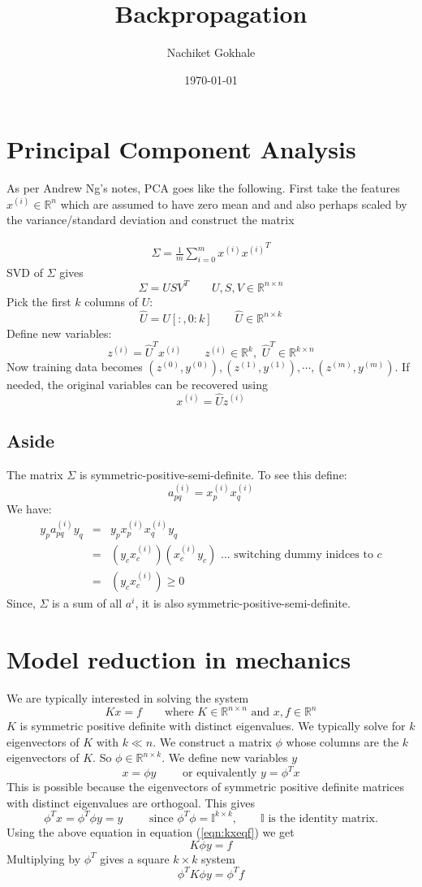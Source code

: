 \documentclass{article}
\newcommand{\beq}{\begin{equation}}
\newcommand{\eeq}{\end{equation}}
\newcommand{\ber}{\begin{eqnarray}}
\newcommand{\eer}{\end{eqnarray}}
\begin{document}
\title{Backpropagation}
\author{Nachiket Gokhale}
\date{\today}
\maketitle
\section{Principal Component Analysis}
As per Andrew Ng's notes, PCA goes like the following. First take the features $x^{(i)} \in \mathbb{R}^n$ which are assumed to have zero mean and and also perhaps scaled by the variance/standard deviation and construct the matrix

\ber
\Sigma = \frac{1}{m}\sum_{i=0}^{m}x^{(i)}{x^{(i)}}^{T}
\eer
%
SVD of $\Sigma$ gives
\beq
\Sigma = USV^{T} \qquad U,S,V \in \mathbb{R}^{n\times{n}}
\eeq
Pick the first $k$ columns of $U$:
\beq
\hat{U} = U[:,0:k]  \qquad \hat{U} \in \mathbb{R}^{n\times{k}}
\eeq
Define new variables:
\beq
z^{(i)}   = {\hat{U}}^{T}x^{(i)} \qquad z^{(i)} \in \mathbb{R}^{k},\,\, {\hat{U}}^{T} \in \mathbb{R}^{k\times{n}}
\eeq
Now training data becomes $(z^{(0)},y^{(0)}), (z^{(1)},y^{(1)}), \cdots, (z^{(m)},y^{(m)})$. If needed, the original variables can be recovered using
\beq
x^{(i)} = \hat{U}z^{(i)}
\eeq

%
%
\subsection{Aside} 
The matrix $\Sigma$ is symmetric-positive-semi-definite. To see this define:
\beq
a_{pq}^{(i)} = x^{(i)}_{p}{x^{(i)}_{q}}
\eeq
We have:
\ber
y_{p}a_{pq}^{(i)}y_{q} &=& y_{p}x^{(i)}_{p}{x^{(i)}_{q}}y_{q}  \\
&=& (y_{c}x^{(i)}_{c})({x^{(i)}_{c}}y_{c}) \text{ ... switching dummy inidces to }c\\
&=& (y_{c}x^{(i)}_{c}) \ge 0
\eer
Since, $\Sigma$ is a sum of all $a^{i}$, it is also symmetric-positive-semi-definite.
\section{Model reduction in mechanics}
We are typically interested in solving the system
\beq
\label{eqn:kxeqf}
Kx = f \qquad \text{where } K\in\mathbb{R}^{n\times{n}} \text{ and } x,f \in \mathbb{R}^n
\eeq
$K$ is symmetric positive definite with distinct eigenvalues. We typically solve for $k$ eigenvectors of $K$ with $k \ll n$. We construct a matrix $\phi$ whose columns are the $k$ eigenvectors of $K$. So $\phi \in \mathbb{R}^{n\times{k}}$. We define new variables $y$
\beq
x = \phi{y} \qquad \text{ or equivalently } y = \phi^Tx
\eeq
This is possible because the eigenvectors of symmetric positive definite matrices with distinct eigenvalues are orthogoal. This gives
\beq
\phi^Tx = \phi^T\phi y = y \qquad \text{ since } \phi^T\phi = \mathbb{I}^{k\times{k}}, \qquad \mathbb{I} \text{ is the identity matrix.}
\eeq
Using the above equation in equation (\ref{eqn:kxeqf}) we get
\beq
K\phi{y} = f
\eeq
Multiplying by $\phi^T$ gives a square $k\times{k}$ system
\beq
\phi^TK\phi{y} = \phi^Tf
\eeq
\end{document}
